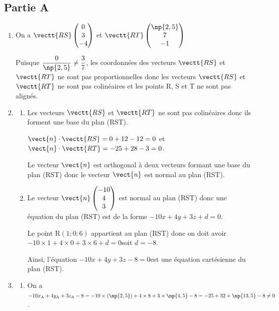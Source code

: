 \subsection*{Partie A}

	\begin{enumerate}
		\item On a $\vectt{RS} \begin{pmatrix}
			0 \\ 3 \\ -4
		\end{pmatrix}$ et $\vectt{RT} \begin{pmatrix}
			\np{2,5} \\ 7 \\ -1
		\end{pmatrix}$

		Puisque $\dfrac{0}{\np{2,5}} \neq \dfrac{3}{7}$, les coordonnées des vecteurs $\vectt{RS}$ et $\vectt{RT}$ ne sont pas proportionnelles donc les vecteurs $\vectt{RS}$ et $\vectt{RT}$ ne sont pas colinéaires et les points R, S et T ne sont pas alignés.

		\item \begin{enumerate}
			\item Les vecteurs $\vectt{RS}$ et $\vectt{RT}$ ne sont pas colinéaires donc ils forment une base du plan (RST).

			$\vect{n}\cdot \vectt{RS} = 0+12-12=0$ \quad et \quad $\vect{n}\cdot \vectt{RT} = -25+28-3=0$.

			Le vecteur $\vect{n}$ est orthogonal à deux vecteurs formant une base du plan (RST) donc le vecteur $\vect{n}$ est normal au plan (RST).

			\item Le vecteur $\vect{n} \begin{pmatrix}-10 \\ 4 \\ 3\end{pmatrix} $ est normal au plan (RST) donc une équation du plan (RST) est de la forme \quad  $-10x+4y+3z+d=0$.

			Le point R$(1;0;6)$ appartient au plan (RST) donc on doit avoir \quad  $-10 \times 1 +4 \times 0 +3 \times 6 + d =0$\quad  soit \quad $d=-8$.

			Ainsi, l'équation \quad $-10x+4y+3z-8=0$\quad est une équation cartésienne du plan (RST).
		\end{enumerate}

		\item \begin{enumerate}
			\item On a \quad $-10x_{\mathrm{A}}+4y_{\mathrm{A}}+3z_{\mathrm{A}}-8 = -10 \times (\np{2,5}) +4 \times 8 +3 \times \np{4,5}  -8 =-25+32+\np{13,5}-8 \neq 0$.


\end{enumerate}
\end{enumerate}
